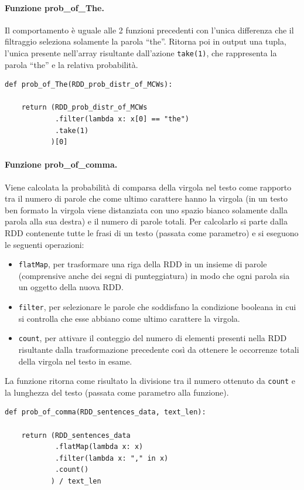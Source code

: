 \documentclass[titlepage]{article}
\begin{document}
\paragraph{Funzione prob\_of\_The.}
Il comportamento è uguale alle 2 funzioni precedenti con l'unica differenza che il filtraggio seleziona solamente la parola ``the''. Ritorna poi in output una tupla, l'unica presente nell'array risultante dall'azione \texttt{take(1)}, che rappresenta la parola ``the'' e la relativa probabilità.
\begin{verbatim}
def prob_of_The(RDD_prob_distr_of_MCWs):
    
    return (RDD_prob_distr_of_MCWs
            .filter(lambda x: x[0] == "the")
            .take(1)
           )[0]
\end{verbatim}

\paragraph{Funzione prob\_of\_comma.}
Viene calcolata la probabilità di comparsa della virgola nel testo come rapporto tra il numero di parole che come ultimo carattere hanno la virgola (in un testo ben formato la virgola viene distanziata con uno spazio bianco solamente dalla parola alla sua destra) e il numero di parole totali. Per calcolarlo si parte dalla RDD contenente tutte le frasi di un testo (passata come parametro) e si eseguono le seguenti operazioni:
\begin{itemize}
    \item \texttt{flatMap}, per trasformare una riga della RDD in un insieme di parole (comprensive anche dei segni di punteggiatura) in modo che ogni parola sia un oggetto della nuova RDD.
    \item \texttt{filter}, per selezionare le parole che soddisfano la condizione booleana in cui si controlla che esse abbiano come ultimo carattere la virgola.
    \item \texttt{count}, per attivare il conteggio del numero di elementi presenti nella RDD risultante dalla trasformazione precedente così da ottenere le occorrenze totali della virgola nel testo in esame.
\end{itemize}
La funzione ritorna come risultato la divisione tra il numero ottenuto da \texttt{count} e la lunghezza del testo (passata come parametro alla funzione).
\begin{verbatim}
def prob_of_comma(RDD_sentences_data, text_len):

    return (RDD_sentences_data
            .flatMap(lambda x: x)
            .filter(lambda x: "," in x)
            .count()
           ) / text_len
\end{verbatim}
\end{document}
